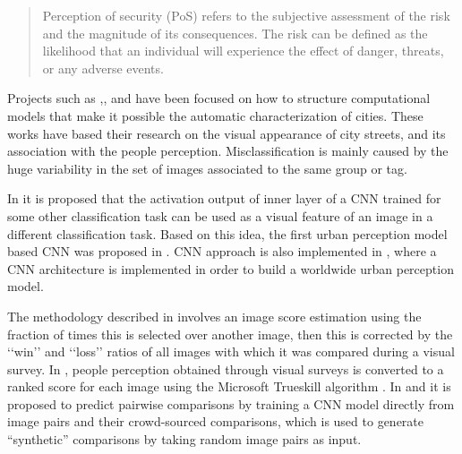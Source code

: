 \documentclass{llncs}
\begin{document}
\begin{quote}
Perception of security (PoS) refers to the subjective assessment of the risk and the magnitude of its consequences. The risk can be defined as the likelihood that an individual will experience the effect of danger, threats, or any adverse events.
\end{quote}





Projects such as \cite{Dubey2016a},\cite{Porzi2015},\cite{Ordonez2014} and \cite{Naik} have been focused on how to structure computational models that make it possible the automatic characterization of cities. These works have based their research on the visual appearance of city streets, and its association with the people perception. Misclassification is mainly caused by the huge variability in the set of images associated to the same group or tag.

In \cite{Donahue2013} it is proposed that the activation output of inner layer of a CNN trained for some other classification task can be used as a visual feature of an image in a different classification task. Based on this idea, the first urban perception model based CNN was proposed in \cite{Porzi2015}. CNN approach is also implemented in \cite{Dubey2016a}, where a CNN architecture is implemented in order to build a worldwide urban perception model.

The methodology described in \cite{Salesses2013} involves an image score estimation using the fraction of times this is selected over another image, then this is corrected by the ‘‘win’’ and ‘‘loss’’ ratios of all images with which it was compared during a visual survey. In \cite{Naik}, people perception obtained through visual surveys is converted to a ranked score for each image using the Microsoft Trueskill algorithm \cite{Herbrich2006}. In \cite{Dubey2016a} and \cite{Porzi2015} it is proposed to predict pairwise comparisons by training a CNN model directly from image pairs and their crowd-sourced comparisons, which is used to generate “synthetic” comparisons by taking random image pairs as input.
\end{document}

